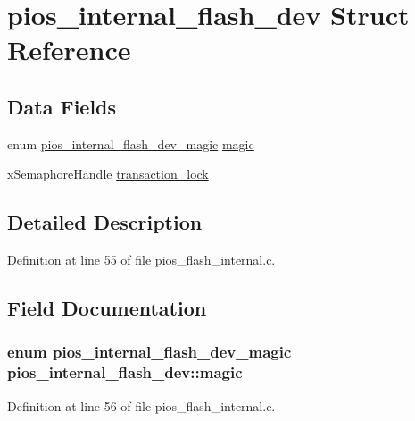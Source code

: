 \hypertarget{structpios__internal__flash__dev}{\section{pios\-\_\-internal\-\_\-flash\-\_\-dev \-Struct \-Reference}
\label{structpios__internal__flash__dev}
}
\subsection*{\-Data \-Fields}
\begin{DoxyCompactItemize}
\item 
enum \hyperlink{_s_t_m32_f30x_2pios__flash__internal_8c_a0eb1120efd5b8655fe38c410b3eebd5c}{pios\-\_\-internal\-\_\-flash\-\_\-dev\-\_\-magic} \hyperlink{structpios__internal__flash__dev_a552d26ec63649d447047928674b6735e}{magic}
\item 
x\-Semaphore\-Handle \hyperlink{structpios__internal__flash__dev_aff0936adda4381f50332373503f0f34e}{transaction\-\_\-lock}
\end{DoxyCompactItemize}


\subsection{\-Detailed \-Description}


\-Definition at line 55 of file pios\-\_\-flash\-\_\-internal.\-c.



\subsection{\-Field \-Documentation}
\hypertarget{structpios__internal__flash__dev_a552d26ec63649d447047928674b6735e}{
\subsubsection[{magic}]{\setlength{\rightskip}{0pt plus 5cm}enum {\bf pios\-\_\-internal\-\_\-flash\-\_\-dev\-\_\-magic} {\bf pios\-\_\-internal\-\_\-flash\-\_\-dev\-::magic}}}\label{structpios__internal__flash__dev_a552d26ec63649d447047928674b6735e}


\-Definition at line 56 of file pios\-\_\-flash\-\_\-internal.\-c.

